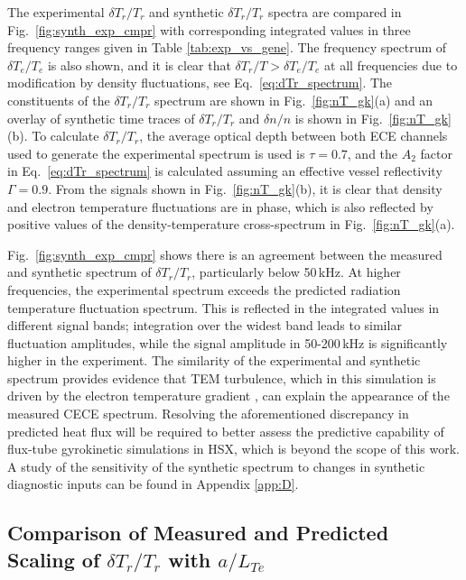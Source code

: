 \documentclass[%
 aip,
 amsmath,amssymb,
 reprint,%
]{revtex4-1}
\begin{document}
The experimental $\delta T_r/T_r$ and synthetic $\delta T_r/T_r$  spectra are compared in Fig.\ \ref{fig:synth_exp_cmpr} with corresponding integrated values in three frequency ranges given in Table \ref{tab:exp_vs_gene}. The frequency spectrum of $\delta T_e/T_e$  is also shown, and it is clear that $\delta T_r/T > \delta T_e/T_e$  at all frequencies due to modification by density fluctuations, see Eq.\ \eqref{eq:dTr_spectrum}. The constituents of the $\delta T_r/T_r$  spectrum are shown in Fig.\ \ref{fig:nT_gk}(a) and an overlay of synthetic time traces of $\delta T_r/T_r$  and $\delta n/n$ is shown in Fig.\ \ref{fig:nT_gk}(b). To calculate $\delta T_r/T_r$, the average optical depth between both ECE channels used to generate the experimental spectrum is used is $\tau = 0.7$, and the $A_2$ factor in Eq.\ \eqref{eq:dTr_spectrum} is calculated assuming an effective vessel reflectivity $\Gamma=0.9$. From the signals shown in Fig.\ \ref{fig:nT_gk}(b), it is clear that density and electron temperature fluctuations are in phase, which is also reflected by positive values of the density-temperature cross-spectrum in  Fig.\ \ref{fig:nT_gk}(a).


Fig.\ \ref{fig:synth_exp_cmpr} shows there is an agreement between the measured and synthetic spectrum of $\delta T_r/T_r$, particularly below 50\,kHz. At higher frequencies, the experimental spectrum exceeds the predicted radiation temperature fluctuation spectrum. This is reflected in the integrated values in different signal bands; integration over the widest band leads to similar fluctuation amplitudes, while the signal amplitude in 50-200\,kHz is significantly higher in the experiment. The similarity of the experimental and synthetic spectrum provides evidence that TEM turbulence, which in this simulation is driven by the electron temperature gradient \cite{matthijs-msc}, can explain the appearance of the measured CECE spectrum. Resolving the aforementioned discrepancy in predicted heat flux will be required to better assess the predictive capability of flux-tube gyrokinetic simulations in HSX, which is beyond the scope of this work. A study of the sensitivity of the synthetic spectrum to changes in synthetic diagnostic inputs can be found in Appendix \ref{app:D}.


\subsection{Comparison of Measured and Predicted Scaling of $\delta T_r/T_r$  with $a/L_{Te}$}
\end{document}

